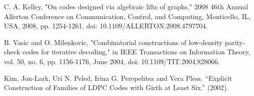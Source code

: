 \documentclass[a4paper,fleqn]{cas-sc}
\begin{document}
\begin{thebibliography}{0}

C. A. Kelley, "On codes designed via algebraic lifts of graphs," 2008 46th Annual Allerton Conference on Communication, Control, and Computing, Monticello, IL, USA, 2008, pp. 1254-1261, doi: 10.1109/ALLERTON.2008.4797704.


B. Vasic and O. Milenkovic, "Combinatorial constructions of low-density parity-check codes for iterative decoding," in IEEE Transactions on Information Theory, vol. 50, no. 6, pp. 1156-1176, June 2004, doi: 10.1109/TIT.2004.828066.

Kim, Jon-Lark, Uri N. Peled, Irina G. Perepelitsa and Vera Pless. “Explicit Construction of Families of LDPC Codes with Girth at Least Six.” (2002).









\end{thebibliography}
\end{document}
